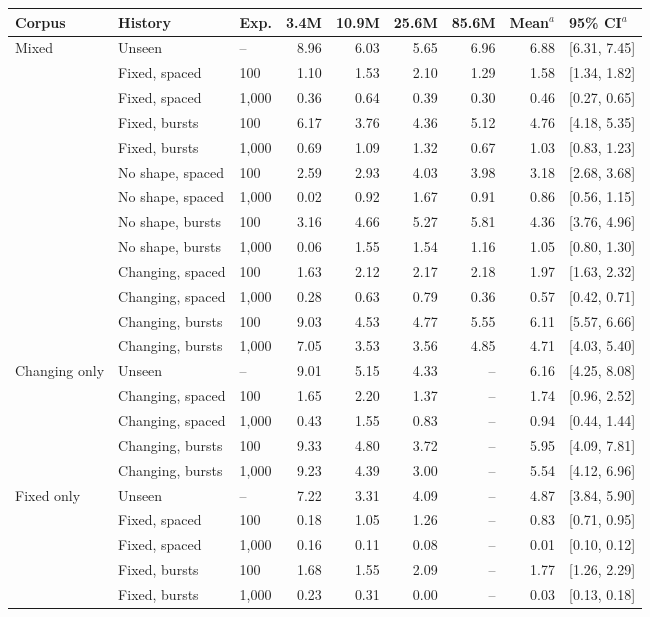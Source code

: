 \begin{tabular}{@{}lllrrrrrl@{}}
\toprule
Corpus & History & Exp. & 3.4M & 10.9M & 25.6M & 85.6M & Mean$^a$ & 95\% CI$^a$ \\
\midrule
Mixed & Unseen & -- & 8.96 & 6.03 & 5.65 & 6.96 & 6.88 & [6.31, 7.45] \\
 & Fixed, spaced & 100 & 1.10 & 1.53 & 2.10 & 1.29 & 1.58 & [1.34, 1.82] \\
 & Fixed, spaced & 1,000 & 0.36 & 0.64 & 0.39 & 0.30 & 0.46 & [0.27, 0.65] \\
 & Fixed, bursts & 100 & 6.17 & 3.76 & 4.36 & 5.12 & 4.76 & [4.18, 5.35] \\
 & Fixed, bursts & 1,000 & 0.69 & 1.09 & 1.32 & 0.67 & 1.03 & [0.83, 1.23] \\
 & No shape, spaced & 100 & 2.59 & 2.93 & 4.03 & 3.98 & 3.18 & [2.68, 3.68] \\
 & No shape, spaced & 1,000 & \textminus{}0.02 & 0.92 & 1.67 & 0.91 & 0.86 & [0.56, 1.15] \\
 & No shape, bursts & 100 & 3.16 & 4.66 & 5.27 & 5.81 & 4.36 & [3.76, 4.96] \\
 & No shape, bursts & 1,000 & 0.06 & 1.55 & 1.54 & 1.16 & 1.05 & [0.80, 1.30] \\
 & Changing, spaced & 100 & 1.63 & 2.12 & 2.17 & 2.18 & 1.97 & [1.63, 2.32] \\
 & Changing, spaced & 1,000 & 0.28 & 0.63 & 0.79 & 0.36 & 0.57 & [0.42, 0.71] \\
 & Changing, bursts & 100 & 9.03 & 4.53 & 4.77 & 5.55 & 6.11 & [5.57, 6.66] \\
 & Changing, bursts & 1,000 & 7.05 & 3.53 & 3.56 & 4.85 & 4.71 & [4.03, 5.40] \\
\midrule
Changing only & Unseen & -- & 9.01 & 5.15 & 4.33 & -- & 6.16 & [4.25, 8.08] \\
 & Changing, spaced & 100 & 1.65 & 2.20 & 1.37 & -- & 1.74 & [0.96, 2.52] \\
 & Changing, spaced & 1,000 & 0.43 & 1.55 & 0.83 & -- & 0.94 & [0.44, 1.44] \\
 & Changing, bursts & 100 & 9.33 & 4.80 & 3.72 & -- & 5.95 & [4.09, 7.81] \\
 & Changing, bursts & 1,000 & 9.23 & 4.39 & 3.00 & -- & 5.54 & [4.12, 6.96] \\
\midrule
Fixed only & Unseen & -- & 7.22 & 3.31 & 4.09 & -- & 4.87 & [3.84, 5.90] \\
 & Fixed, spaced & 100 & 0.18 & 1.05 & 1.26 & -- & 0.83 & [0.71, 0.95] \\
 & Fixed, spaced & 1,000 & \textminus{}0.16 & 0.11 & 0.08 & -- & 0.01 & [\textminus{}0.10, 0.12] \\
 & Fixed, bursts & 100 & 1.68 & 1.55 & 2.09 & -- & 1.77 & [1.26, 2.29] \\
 & Fixed, bursts & 1,000 & \textminus{}0.23 & 0.31 & 0.00 & -- & 0.03 & [\textminus{}0.13, 0.18] \\
\bottomrule
\end{tabular}
